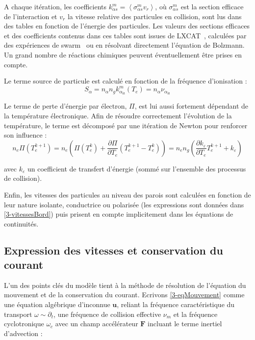 \begin{refsection}
A chaque itération, les coefficients $k^m_{\alpha s}=\left<\sigma^m_{\alpha
s}v_r\right>$, où $\sigma^m_{\alpha
s}$ est la section efficace de l'interaction et $v_r$ la vitesse relative des
particules en collision, sont lus dans des tables en fonction de l'énergie des
particules.
Les valeurs des sections efficaces et des coefficients contenus dans ces tables
sont issues de LXCAT~\parencite{LXCAT}, calculées par des expériences de
swarm~\parencite{Phelps} ou en résolvant directement l'équation de
Bolzmann\parencite{Bolsig}. Un grand
nombre de réactions chimiques peuvent éventuellement être prises en compte.

Le terme source de particule est calculé en fonction de la fréquence
d'ionisation :
\begin{equation*}
S_{\alpha}=n_\alpha n_g k^m_{\alpha_\text{iz}}(T_e)=n_\alpha\nu_{\alpha_\text{iz}}
\end{equation*}

Le terme de perte d'énergie par électron, $\Pi$, est lui aussi fortement
dépendant de la température électronique. Afin de résoudre correctement
l'évolution de la température, le terme est décomposé par une itération
de Newton pour renforcer son influence :
\begin{equation*}
n_e\Pi(T_e^{k+1})=n_e\left(\Pi(T_e^{k})+\frac{\partial\Pi}{\partial
T_e}\left(T_e^{k+1}-T_e^{k}\right)\right)= n_en_g\left(
\frac{\partial k_{\varepsilon}}{\partial T_e}T_e^{k+1}+k_{\varepsilon}\right)
\end{equation*}

avec $k_\varepsilon$ un coefficient de transfert d'énergie (sommé sur 
l'ensemble des processus de collision).

Enfin, les vitesses des particules au niveau des parois sont calculées en
fonction de leur nature isolante, conductrice ou polarisée (les expressions
sont données dans \ref{3-vitessesBord}) puis prisent en compte implicitement
dans les équations de continuités.

\subsection{Expression des vitesses et conservation du courant}
L'un des points clés du modèle tient à la méthode de résolution de l'équation du
mouvement et de la conservation du courant. Ecrivons \eqref{3-eqMouvement} comme
une équation algébrique d'inconnue $\mathbf u$, reliant la fréquence caractéristique du transport
$\omega\sim\partial_t$, une fréquence de collision effective $\nu_m$ et la
fréquence cyclotronique $\omega_c$ avec un champ
accélérateur $\mathbf F$ incluant le terme inertiel d'advection :


\end{refsection}
